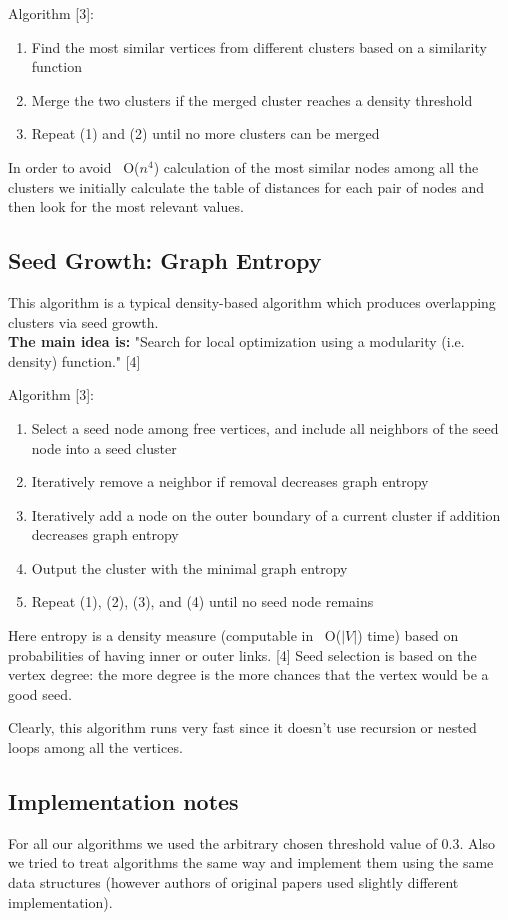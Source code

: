 \documentclass[journal]{IEEEtran}
\begin{document}
Algorithm [3]:
\begin{enumerate}
	\item Find the most similar vertices from different clusters based on a similarity
	function
	\item Merge the two clusters if the merged cluster reaches a density threshold
	\item Repeat (1) and (2) until no more clusters can be merged
\end{enumerate}

In order to avoid ~O($n^4$) calculation of the most similar nodes among all the clusters we initially calculate the table of distances for each pair of nodes and then look for the most relevant values.  

\subsection{Seed Growth: Graph Entropy}
This algorithm is a typical density-based algorithm which produces overlapping clusters via seed growth. \\
\textbf{The main idea is:} "Search for local optimization using a modularity (i.e. density) function." [4]

Algorithm [3]:
\begin{enumerate}
	\item Select a seed node among free vertices, and include all neighbors of the seed node into a seed cluster
	\item Iteratively remove a neighbor if removal decreases graph entropy
	\item Iteratively add a node on the outer boundary of a current cluster if addition decreases graph entropy
	\item Output the cluster with the minimal graph entropy
	\item Repeat (1), (2), (3), and (4) until no seed node remains
\end{enumerate}

Here entropy is a density measure (computable in ~O($|V|$) time) based on probabilities of having inner or outer links. [4] Seed selection is based on the vertex degree: the more degree is the more chances that the vertex would be a good seed.

Clearly, this algorithm runs very fast since it doesn't use recursion or nested loops among all the vertices.

\subsection{Implementation notes}
For all our algorithms we used the arbitrary chosen threshold value of 0.3. Also we tried to treat algorithms the same way and implement them using the same data structures (however authors of original papers used slightly different implementation). 
\end{document}
